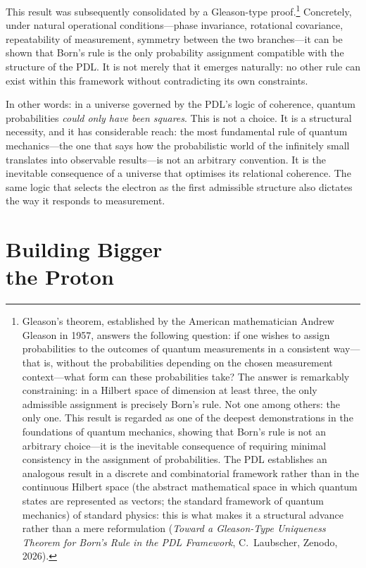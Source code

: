 \documentclass[12pt, a4paper, openright]{book}
\begin{document}
\medskip

This result was subsequently consolidated by a Gleason-type proof.\footnote{Gleason's theorem, established by the American mathematician Andrew Gleason in 1957, answers the following question: if one wishes to assign probabilities to the outcomes of quantum measurements in a consistent way---that is, without the probabilities depending on the chosen measurement context---what form can these probabilities take? The answer is remarkably constraining: in a Hilbert space of dimension at least three, the only admissible assignment is precisely Born's rule. Not one among others: the only one. This result is regarded as one of the deepest demonstrations in the foundations of quantum mechanics, showing that Born's rule is not an arbitrary choice---it is the inevitable consequence of requiring minimal consistency in the assignment of probabilities. The PDL establishes an analogous result in a discrete and combinatorial framework rather than in the continuous Hilbert space (the abstract mathematical space in which quantum states are represented as vectors; the standard framework of quantum mechanics) of standard physics: this is what makes it a structural advance rather than a mere reformulation (\textit{Toward a Gleason-Type Uniqueness Theorem for Born's Rule in the PDL Framework}, C.~Laubscher, Zenodo, 2026).} Concretely, under natural operational conditions---phase invariance, rotational covariance, repeatability of measurement, symmetry between the two branches---it can be shown that Born's rule is the only probability assignment compatible with the structure of the PDL. It is not merely that it emerges naturally: no other rule can exist within this framework without contradicting its own constraints.

\medskip

In other words: in a universe governed by the PDL's logic of coherence, quantum probabilities \emph{could only have been squares}. This is not a choice. It is a structural necessity, and it has considerable reach: the most fundamental rule of quantum mechanics---the one that says how the probabilistic world of the infinitely small translates into observable results---is not an arbitrary convention. It is the inevitable consequence of a universe that optimises its relational coherence. The same logic that selects the electron as the first admissible structure also dictates the way it responds to measurement. 

\chapter[Building Bigger --- the Proton]{Building Bigger \\ the Proton}
\end{document}
